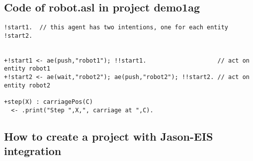 \documentclass{article}
\begin{document}
\subsection*{Code of robot.asl in project demo1ag}
\begin{verbatim}
!start1.  // this agent has two intentions, one for each entity
!start2.


+!start1 <- ae(push,"robot1"); !!start1.                    // act on entity robot1
+!start2 <- ae(wait,"robot2"); ae(push,"robot2"); !!start2. // act on entity robot2

+step(X) : carriagePos(C) 
  <- .print("Step ",X,", carriage at ",C).
\end{verbatim}

\subsection*{How to create a project with Jason-EIS integration}
\end{document}
